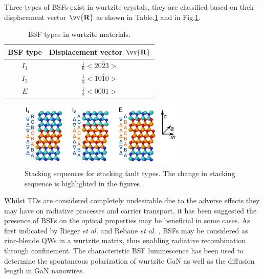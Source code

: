 Three types of BSFs exist in wurtzite crystals, they are classified based on their displacement vector $\mathbf{\vv{R}}$ as shown in Table.\ref{tab1.5} and in Fig.\ref{bsf_type}.

\begin{table}[h]
	\centering
	\begin{tabular}{cc}
		\centering
		\textbf{BSF type}& \textbf{Displacement vector $\mathbf{\vv{R}}$ } \\
		\hline
		$I_{1}$  & $\frac{1}{6}<20\bar{2}3>$ \\
		$I_{2}$ & $\frac{1}{3}<10\bar{1}0>$ \\
		$E$  & $\frac{1}{2}<0001>$ \\
		\hline
		
	\end{tabular}
	\caption{BSF types in wurtzite materials.}
	\label{tab1.5}
\end{table}
\FloatBarrier

\begin{figure}[h]
	\centering
	\includegraphics[width=0.7\textwidth]{Figs/Ch1/bsf_type.png}
	\caption {Stacking sequences for stacking fault types. The change in stacking sequence is highlighted in the figures \cite{Lahnemann2014}.}
	\label{bsf_type}
\end{figure}
\FloatBarrier 

Whilst TDs are considered completely undesirable due to the adverse effects they may have on radiative processes and carrier transport, it has been suggested the presence of BSFs on the optical properties may be beneficial in some cases. As first indicated by Rieger {\it et al.} \cite{Rieger1996} and Rebane {\it et al.} \cite{Rebane1997}, BSFs may be considered as zinc-blende QWs in a wurtzite matrix, thus enabling radiative recombination through confinement. The characteristic BSF luminescence has been used to determine the spontaneous polarization of wurtzite GaN \cite{Lahnemann2012} as well as the diffusion length in GaN nanowires\cite{Nogues2014}.

